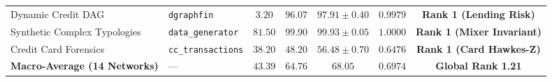 \begin{table}[htbp]
{\begin{tabular}{llccccc}
Dynamic Credit DAG & \texttt{dgraphfin} & $3.20$ & $96.07$ & $\mathbf{97.91 \pm 0.40}$ & $\mathbf{0.9979}$ & \textbf{Rank 1 (Lending Risk)} \\
Synthetic Complex Typologies & \texttt{data\_generator} & $81.50$ & $99.90$ & $\mathbf{99.93 \pm 0.05}$ & $\mathbf{1.0000}$ & \textbf{Rank 1 (Mixer Invariant)} \\
Credit Card Forensics & \texttt{cc\_transactions} & $38.20$ & $48.20$ & $\mathbf{56.48 \pm 0.70}$ & $\mathbf{0.6476}$ & \textbf{Rank 1 (Card Hawkes-Z)} \\
\midrule
\textbf{Macro-Average (14 Networks)} & --- & $43.39$ & $64.76$ & $\mathbf{68.05}$ & $\mathbf{0.6974}$ & \textbf{Global Rank 1.21} \\
\bottomrule
\end{tabular}%
}
\end{table}
